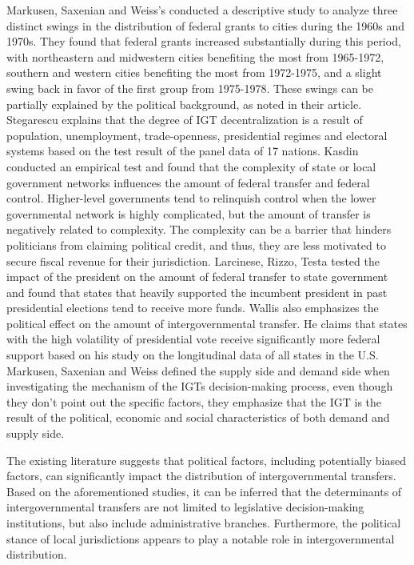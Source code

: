 Markusen, Saxenian and Weiss's \cite{markusen1981benefits}conducted a descriptive study to analyze three distinct swings in the distribution of federal grants to cities during the 1960s and 1970s. They found that federal grants increased substantially during this period, with northeastern and midwestern cities benefiting the most from 1965-1972, southern and western cities benefiting the most from 1972-1975, and a slight swing back in favor of the first group from 1975-1978. These swings can be partially explained by the political background, as noted in their article. Stegarescu \cite{stegarescu2006decentralised} explains that the degree of IGT decentralization is a result of population, unemployment, trade-openness, presidential regimes and electoral systems based on the test result of the panel data of 17 nations. Kasdin \cite{kasdin2016decision} conducted an empirical test and found that the complexity of state or local government networks influences the amount of federal transfer and federal control. Higher-level governments tend to relinquish control when the lower governmental network is highly complicated, but the amount of transfer is negatively related to complexity. The complexity can be a barrier that hinders politicians from claiming political credit, and thus, they are less motivated to secure fiscal revenue for their jurisdiction. Larcinese, Rizzo, Testa \cite{larcinese2006allocating} tested the impact of the president on the amount of federal transfer to state government and found that states that heavily supported the incumbent president in past presidential elections tend to receive more funds. Wallis \cite{wallis1987employment} also emphasizes the political effect on the amount of intergovernmental transfer. He claims that states with the high volatility of presidential vote receive significantly more federal support based on his study on the longitudinal data of all states in the U.S. Markusen, Saxenian and Weiss \cite{markusen1981benefits} defined the supply side and demand side when investigating the mechanism of the IGTs decision-making process, even though they don't point out the specific factors, they emphasize that the IGT is the result of the political, economic and social characteristics of both demand and supply side.

The existing literature suggests that political factors, including potentially biased factors, can significantly impact the distribution of intergovernmental transfers. Based on the aforementioned studies, it can be inferred that the determinants of intergovernmental transfers are not limited to legislative decision-making institutions, but also include administrative branches. Furthermore, the political stance of local jurisdictions appears to play a notable role in intergovernmental distribution.

